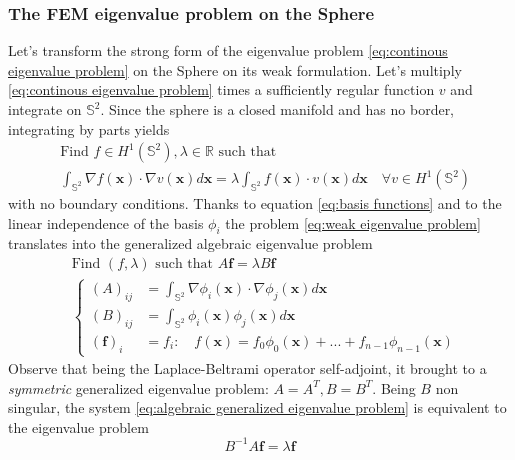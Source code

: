 \subsubsection{The FEM eigenvalue problem on the Sphere}
Let's transform the strong form of the eigenvalue problem \ref{eq:continous eigenvalue problem} on the Sphere on its weak formulation. Let's multiply \ref{eq:continous eigenvalue problem} times a sufficiently regular function $v$ and integrate on $\mathbb S^2$. Since the sphere is a closed manifold and has no border, integrating by parts yields
\begin{equation}\label{eq:weak eigenvalue problem}
\begin{split}
&\text{Find } f\in H^1(\mathbb S^2), \lambda\in\mathbb R\text{ such that }\\ 
&\int_{\mathbb S^2} \nabla f(\mathbf x)\cdot\nabla v(\mathbf x) d\mathbf x = \lambda \int_{\mathbb S^2} f(\mathbf x)\cdot v(\mathbf x)d\mathbf x\quad \forall v\in H^1(\mathbb S^2)
\end{split}
\end{equation}
with no boundary conditions. Thanks to equation \ref{eq:basis functions} and to the linear independence of the basis $\phi_i$ the problem \ref{eq:weak eigenvalue problem} translates into the generalized algebraic eigenvalue problem
\begin{align}\label{eq:algebraic generalized eigenvalue problem}
	&\text{Find }(f,\lambda)\text{ such that }A\mathbf f = \lambda B \mathbf f\\
	&\begin{cases}
	(A)_{ij} &= \int_{\mathbb S^2}\nabla \phi_i(\mathbf{x})\cdot \nabla \phi_j(\mathbf{x})d\mathbf{x}\\
	(B)_{ij} &= \int_{\mathbb S^2} \phi_i(\mathbf{x}) \phi_j(\mathbf{x})d\mathbf{x}\\
	(\mathbf f)_i &= f_i:\quad f(\mathbf x) = f_0\phi_0(\mathbf x)+ ... + f_{n-1}\phi_{n-1}(\mathbf x) 
	\end{cases}
\end{align}
Observe that being the Laplace-Beltrami operator self-adjoint, it brought to a \textit{symmetric} generalized eigenvalue problem: $A=A^T, B=B^T$. Being $B$ non singular, the system \ref{eq:algebraic generalized eigenvalue problem} is equivalent to the eigenvalue problem
\begin{equation}\label{eq:algebraic  eigenvalue problem}
B^{-1}A\mathbf f = \lambda \mathbf f
\end{equation}

